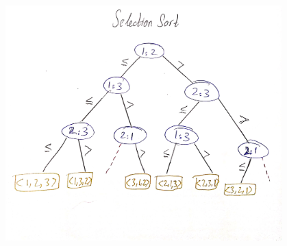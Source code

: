 \documentclass[a4paper]{exam}
\begin{document}
\begin{questions}
\begin{solution}
    
    
    
    \centering
    \includegraphics[width=0.8\textwidth]{select.jpeg}



\end{solution}
\end{questions}
\end{document}
